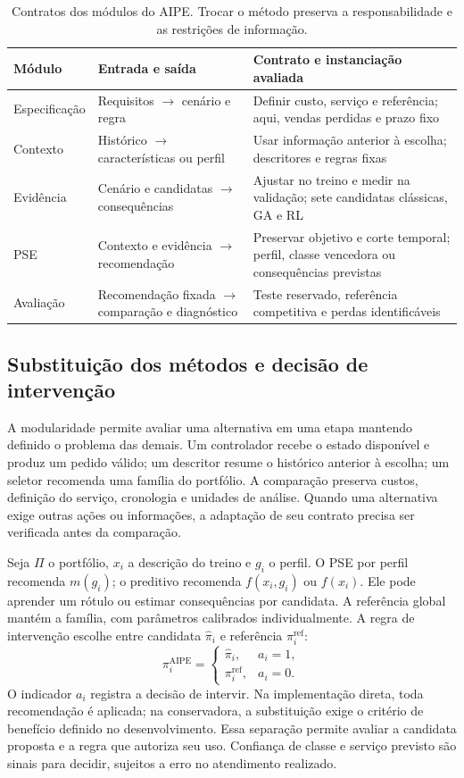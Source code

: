 \documentclass[preprint,12pt]{elsarticle}
\begin{document}
\begin{table}[htbp]\centering\small
\caption{Contratos dos módulos do AIPE. Trocar o método preserva a responsabilidade e as restrições de informação.}\label{tab:modules}
\begin{tabular}{@{}p{2.4cm}p{4.0cm}p{4.8cm}@{}}\toprule
Módulo & Entrada e saída & Contrato e instanciação avaliada\\\midrule
Especificação & Requisitos $\to$ cenário e regra & Definir custo, serviço e referência; aqui, vendas perdidas e prazo fixo\\
Contexto & Histórico $\to$ características ou perfil & Usar informação anterior à escolha; descritores e regras fixas\\
Evidência & Cenário e candidatas $\to$ consequências & Ajustar no treino e medir na validação; sete candidatas clássicas, GA e RL\\
PSE & Contexto e evidência $\to$ recomendação & Preservar objetivo e corte temporal; perfil, classe vencedora ou consequências previstas\\
Avaliação & Recomendação fixada $\to$ comparação e diagnóstico & Teste reservado, referência competitiva e perdas identificáveis\\\bottomrule
\end{tabular}\end{table}

\subsection{Substituição dos métodos e decisão de intervenção}
A modularidade permite avaliar uma alternativa em uma etapa mantendo definido o problema das demais. Um controlador recebe o estado disponível e produz um pedido válido; um descritor resume o histórico anterior à escolha; um seletor recomenda uma família do portfólio. A comparação preserva custos, definição do serviço, cronologia e unidades de análise. Quando uma alternativa exige outras ações ou informações, a adaptação de seu contrato precisa ser verificada antes da comparação.

Seja $\Pi$ o portfólio, $x_i$ a descrição do treino e $g_i$ o perfil. O PSE por perfil recomenda $m(g_i)$; o preditivo recomenda $f(x_i,g_i)$ ou $f(x_i)$. Ele pode aprender um rótulo ou estimar consequências por candidata. A referência global mantém a família, com parâmetros calibrados individualmente. A regra de intervenção escolhe entre candidata $\widehat\pi_i$ e referência $\pi_i^{\mathrm{ref}}$:
\[
 \pi_i^{\mathrm{AIPE}}=
 \begin{cases}\widehat\pi_i,&a_i=1,\\\pi_i^{\mathrm{ref}},&a_i=0.\end{cases}
\]
O indicador $a_i$ registra a decisão de intervir. Na implementação direta, toda recomendação é aplicada; na conservadora, a substituição exige o critério de benefício definido no desenvolvimento. Essa separação permite avaliar a candidata proposta e a regra que autoriza seu uso. Confiança de classe e serviço previsto são sinais para decidir, sujeitos a erro no atendimento realizado.
\end{document}
